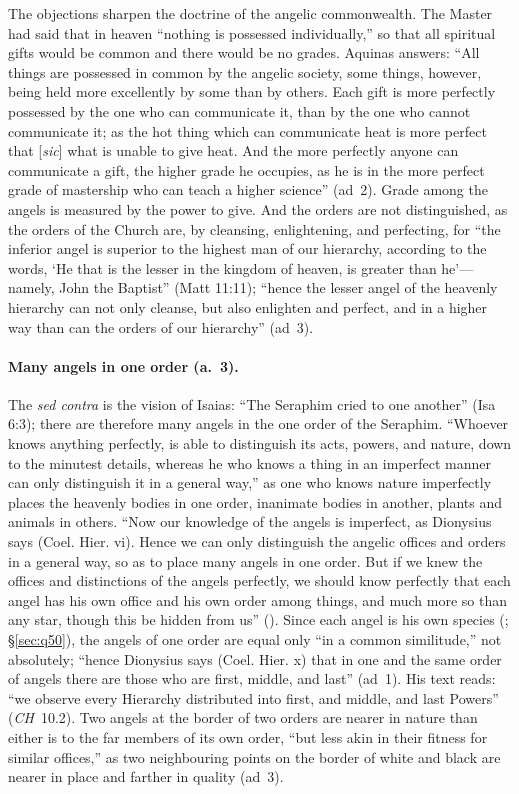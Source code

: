 The objections sharpen the doctrine of the angelic commonwealth. The Master
had said that in heaven ``nothing is possessed individually,'' so that all
spiritual gifts would be common and there would be no grades. Aquinas
answers: ``All things are possessed in common by the angelic society, some
things, however, being held more excellently by some than by others. Each
gift is more perfectly possessed by the one who can communicate it, than by
the one who cannot communicate it; as the hot thing which can communicate
heat is more perfect that [\emph{sic}] what is unable to give heat. And the more
perfectly anyone can communicate a gift, the higher grade he occupies, as he
is in the more perfect grade of mastership who can teach a higher science''
(ad~2). Grade among the angels is measured by the power to give. And the
orders are not distinguished, as the orders of the Church are, by cleansing,
enlightening, and perfecting, for ``the inferior angel is superior to the
highest man of our hierarchy, according to the words, `He that is the lesser
in the kingdom of heaven, is greater than he'---namely, John the Baptist''
(Matt 11:11); ``hence the lesser angel of the heavenly hierarchy can not only
cleanse, but also enlighten and perfect, and in a higher way than can the
orders of our hierarchy'' (ad~3).

\paragraph{Many angels in one order (a.~3).} The \emph{sed contra} is the
vision of Isaias: ``The Seraphim cried to one another'' (Isa 6:3); there are
therefore many angels in the one order of the Seraphim. ``Whoever knows
anything perfectly, is able to distinguish its acts, powers, and nature,
down to the minutest details, whereas he who knows a thing in an imperfect
manner can only distinguish it in a general way,'' as one who knows nature
imperfectly places the heavenly bodies in one order, inanimate bodies in
another, plants and animals in others. ``Now our knowledge of the angels is
imperfect, as Dionysius says (Coel. Hier. vi). Hence we can only distinguish
the angelic offices and orders in a general way, so as to place many angels
in one order. But if we knew the offices and distinctions of the angels
perfectly, we should know perfectly that each angel has his own office and
his own order among things, and much more so than any star, though this be
hidden from us'' (). Since each angel is his own
species (; \S\ref{sec:q50}), the angels of one order are
equal only ``in a common similitude,'' not absolutely; ``hence Dionysius
says (Coel. Hier. x) that in one and the same order of angels there are
those who are first, middle, and last'' (ad~1). His text reads: ``we observe
every Hierarchy distributed into first, and middle, and last Powers''
(\emph{CH}~10.2). Two angels at the border of two orders are nearer in
nature than either is to the far members of its own order, ``but less akin
in their fitness for similar offices,'' as two neighbouring points on the
border of white and black are nearer in place and farther in quality
(ad~3).

